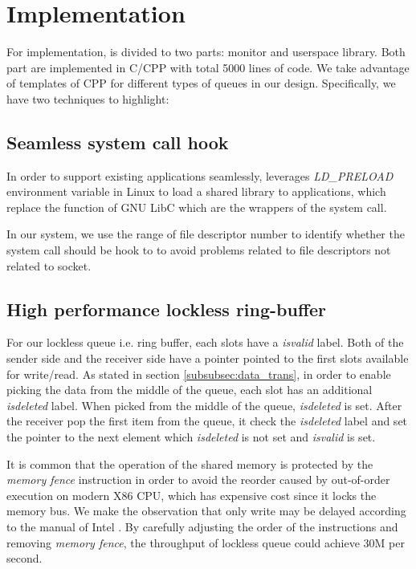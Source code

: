 \section{Implementation}
\label{sec:implementation}

For implementation, \libipc is divided to two parts: monitor and userspace library. Both part are implemented in C/CPP with total 5000 lines of code. We take advantage of templates of CPP for different types of queues in our design. Specifically, we have two techniques to highlight:
\subsection{Seamless system call hook}
\label{subsec:syscall-hook}
In order to support existing applications seamlessly, \libipc leverages \textit{LD\_PRELOAD} environment variable in Linux to load a shared library to applications, which replace the function of GNU LibC which are the wrappers of the system call. 

In our system, we use the range of file descriptor number to identify whether the system call should be hook to \libipc to avoid problems related to file descriptors not related to socket.

\subsection{High performance lockless ring-buffer}
\label{subsec:lockless-queue}

For our lockless queue i.e. ring buffer, each slots have a \textit{isvalid} label. Both of the sender side and the receiver side have a pointer pointed to the first slots available for write/read. As stated in section \ref{subsubsec:data_trans}, in order to enable picking the data from the middle of the queue, each slot has an additional \textit{isdeleted} label. When picked from the middle of the queue, \textit{isdeleted} is set. After the receiver pop the first item from the queue, it check the \textit{isdeleted} label and set the pointer to the next element which \textit{isdeleted} is not set and \textit{isvalid} is set.

It is common that the operation of the shared memory is protected by the \textit{memory fence} instruction in order to avoid the reorder caused by out-of-order execution on modern X86 CPU, which has expensive cost since it locks the memory bus. We make the observation that only write may be delayed according to the manual of Intel \cite{sewell2010x86,intel-manual}. By carefully adjusting the order of the instructions and removing \textit{memory fence}, the throughput of lockless queue could achieve 30M per second. 

